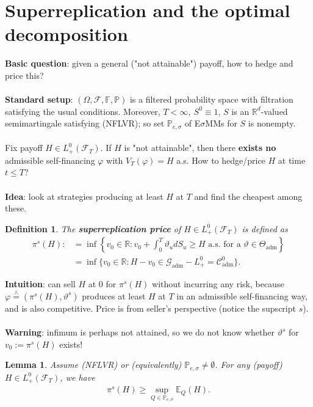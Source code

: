 \documentclass[12pt,a4paper, twoside]{article}
\newtheorem{lem}{Lemma}[section]
\newtheorem{defn}{Definition}[section]
\theoremstyle{definition}
\newcommand{\EE}{\mathbb{E}} %
\newcommand{\PP}{\mathbb{P}} %
\newcommand{\teq}{\overset{\wedge}{=}}
\begin{document}
\section{Superreplication and the optimal decomposition}
\textbf{Basic question}: given a general ("not attainable") payoff, how to hedge and price this?\\
\\
\textbf{Standard setup}: $( \Omega, \mathcal{F}, \mathbb{F}, \PP)$ is a filtered probability space with filtration satisfying the usual conditions. Moreover, $T< \infty, \ S^0 \equiv 1$, $S$ is an $\mathbb{R}^d$-valued semimartingale satisfying (NFLVR); so set $\PP_{e, \sigma}$ of E$\sigma$MMs for $S$ is nonempty. 
\\\\
Fix payoff $H \in L_+^0( \mathcal{F}_T)$. If $H$ is "not attainable", then there \textbf{exists no} admissible self-financing $\varphi$ with $V_T( \varphi)= H$ a.s. How to hedge/price $H$ at time $t \leq T$?
\\\\
\textbf{Idea}: look at strategies producing at least $H$ at $T$ and find the cheapest among these. 
\begin{defn} The \textbf{superreplication price} of $H \in L_+^0( \mathcal{F}_T)$ is  defined as 
\begin{align*}
\pi^s(H) :&= \inf \left\{ v_0 \in \mathbb{R}: v_0 + \int_0^T \vartheta_u dS_u \geq H \text{ a.s. for a } \vartheta \in \Theta_\text{adm} \right\} \\
&= \inf \{ v_0 \in \mathbb{R}: H- v_0 \in \mathcal{G}_\text{adm}-L_+^0 = \mathcal{C}_\text{adm}^0 \}.
\end{align*}
\end{defn}
\noindent \textbf{Intuition}: can sell $H$ at $0$ for $\pi^s (H)$ without incurring any risk, because $\varphi \teq ( \pi^s(H), \vartheta^s)$ produces at least $H$ at $T$ in an admissible self-financing way, and is also competitive. Price is from seller's perspective (notice the supscript $s$). 
\\\\
\textbf{Warning}: infimum is perhaps not attained, so we do not know whether $\vartheta^s$ for $v_0 := \pi^s(H)$ exists!
\begin{lem} \label{L71} Assume (NFLVR) or (equivalently) $\PP_{e, \sigma} \neq \emptyset$. For any (payoff) $H \in L_+^0( \mathcal{F}_T)$, we have 
\begin{align*}
\pi^s(H) \geq \sup_{Q \in \PP_{e, \sigma}} \EE_Q(H). 
\end{align*}
\end{lem}
\end{document}
